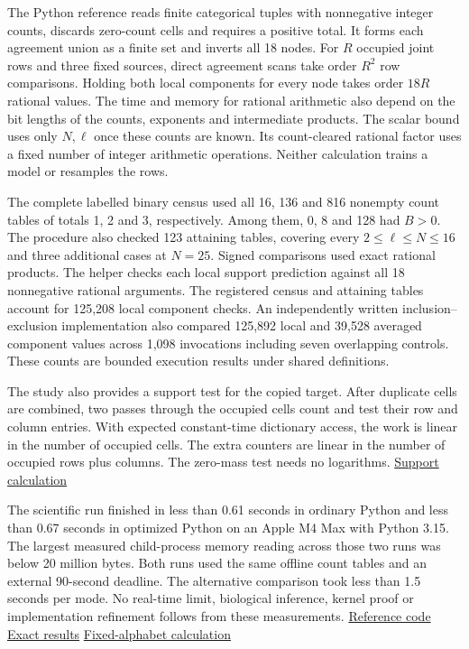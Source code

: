 The Python reference reads finite categorical tuples with nonnegative integer counts, discards zero-count cells and requires a positive total. It forms each agreement union as a finite set and inverts all 18 nodes. For \(R\) occupied joint rows and three fixed sources, direct agreement scans take order \(R^2\) row comparisons. Holding both local components for every node takes order \(18R\) rational values. The time and memory for rational arithmetic also depend on the bit lengths of the counts, exponents and intermediate products. The scalar bound uses only \(N,\ell\) once these counts are known. Its count-cleared rational factor uses a fixed number of integer arithmetic operations. Neither calculation trains a model or resamples the rows.

The complete labelled binary census used all 16, 136 and 816 nonempty count tables of totals 1, 2 and 3, respectively. Among them, 0, 8 and 128 had \(B>0\). The procedure also checked 123 attaining tables, covering every \(2\leq\ell\leq N\leq16\) and three additional cases at \(N=25\). Signed comparisons used exact rational products. The helper checks each local support prediction against all 18 nonnegative rational arguments. The registered census and attaining tables account for 125,208 local component checks. An independently written inclusion--exclusion implementation also compared 125,892 local and 39,528 averaged component values across 1,098 invocations including seven overlapping controls. These counts are bounded execution results under shared definitions.

The study also provides a support test for the copied target. After duplicate cells are combined, two passes through the occupied cells count and test their row and column entries. With expected constant-time dictionary access, the work is linear in the number of occupied cells. The extra counters are linear in the number of occupied rows plus columns. The zero-mass test needs no logarithms. \href{https://github.com/sepahead/pid-rs/blob/main/audit/research/categorical-third-source-budget-sharpness/independent/copy-target/copy_support.py}{Support calculation}

The scientific run finished in less than 0.61 seconds in ordinary Python and less than 0.67 seconds in optimized Python on an Apple M4 Max with Python 3.15. The largest measured child-process memory reading across those two runs was below 20 million bytes. Both runs used the same offline count tables and an external 90-second deadline. The alternative comparison took less than 1.5 seconds per mode. No real-time limit, biological inference, kernel proof or implementation refinement follows from these measurements. \href{https://github.com/sepahead/pid-rs/blob/main/audit/research/categorical-third-source-budget-sharpness/verify.py}{Reference code} \href{https://github.com/sepahead/pid-rs/blob/main/audit/research/categorical-third-source-budget-sharpness/RESULT.json}{Exact results} \href{https://github.com/sepahead/pid-rs/blob/main/audit/research/categorical-third-source-budget-sharpness/alphabet_scope.py}{Fixed-alphabet calculation}

